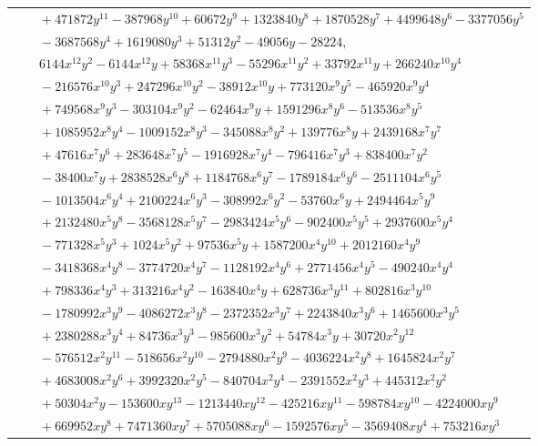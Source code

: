 \documentclass[11pt]{article}
\begin{document}
\begin{longtable}{@{}ll@{}}
 & $\quad +471872y^{11}-387968y^{10}+60672y^{9}+1323840y^{8}+1870528y^{7}+4499648y^{6}-3377056y^{5}$\\
 & $\quad -3687568y^{4}+1619080y^{3}+51312y^{2}-49056y-28224,$\\
 & $\quad 6144x^{12}y^{2}-6144x^{12}y+58368x^{11}y^{3}-55296x^{11}y^{2}+33792x^{11}y+266240x^{10}y^{4}$\\
 & $\quad -216576x^{10}y^{3}+247296x^{10}y^{2}-38912x^{10}y+773120x^{9}y^{5}-465920x^{9}y^{4}$\\
 & $\quad +749568x^{9}y^{3}-303104x^{9}y^{2}-62464x^{9}y+1591296x^{8}y^{6}-513536x^{8}y^{5}$\\
 & $\quad +1085952x^{8}y^{4}-1009152x^{8}y^{3}-345088x^{8}y^{2}+139776x^{8}y+2439168x^{7}y^{7}$\\
 & $\quad +47616x^{7}y^{6}+283648x^{7}y^{5}-1916928x^{7}y^{4}-796416x^{7}y^{3}+838400x^{7}y^{2}$\\
 & $\quad -38400x^{7}y+2838528x^{6}y^{8}+1184768x^{6}y^{7}-1789184x^{6}y^{6}-2511104x^{6}y^{5}$\\
 & $\quad -1013504x^{6}y^{4}+2100224x^{6}y^{3}-308992x^{6}y^{2}-53760x^{6}y+2494464x^{5}y^{9}$\\
 & $\quad +2132480x^{5}y^{8}-3568128x^{5}y^{7}-2983424x^{5}y^{6}-902400x^{5}y^{5}+2937600x^{5}y^{4}$\\
 & $\quad -771328x^{5}y^{3}+1024x^{5}y^{2}+97536x^{5}y+1587200x^{4}y^{10}+2012160x^{4}y^{9}$\\
 & $\quad -3418368x^{4}y^{8}-3774720x^{4}y^{7}-1128192x^{4}y^{6}+2771456x^{4}y^{5}-490240x^{4}y^{4}$\\
 & $\quad +798336x^{4}y^{3}+313216x^{4}y^{2}-163840x^{4}y+628736x^{3}y^{11}+802816x^{3}y^{10}$\\
 & $\quad -1780992x^{3}y^{9}-4086272x^{3}y^{8}-2372352x^{3}y^{7}+2243840x^{3}y^{6}+1465600x^{3}y^{5}$\\
 & $\quad +2380288x^{3}y^{4}+84736x^{3}y^{3}-985600x^{3}y^{2}+54784x^{3}y+30720x^{2}y^{12}$\\
 & $\quad -576512x^{2}y^{11}-518656x^{2}y^{10}-2794880x^{2}y^{9}-4036224x^{2}y^{8}+1645824x^{2}y^{7}$\\
 & $\quad +4683008x^{2}y^{6}+3992320x^{2}y^{5}-840704x^{2}y^{4}-2391552x^{2}y^{3}+445312x^{2}y^{2}$\\
 & $\quad +50304x^{2}y-153600xy^{13}-1213440xy^{12}-425216xy^{11}-598784xy^{10}-4224000xy^{9}$\\
 & $\quad +669952xy^{8}+7471360xy^{7}+5705088xy^{6}-1592576xy^{5}-3569408xy^{4}+753216xy^{3}$\\

\end{longtable}
\end{document}
